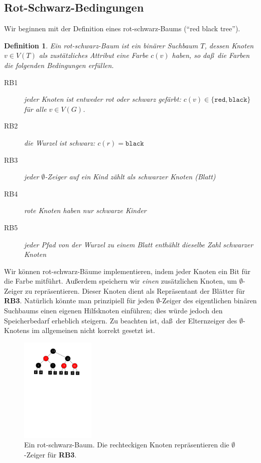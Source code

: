\documentclass[10pt,reqno]{amsart}
\numberwithin{equation}{section}
\newcommand\red{\mathtt{red}}
\newcommand\black{\mathtt{black}}
\newtheorem{definition}{Definition}[section]
\begin{document}
\subsection{Rot-Schwarz-Bedingungen}\label{sec_rb_cond}

Wir beginnen mit der Definition eines rot-schwarz-Baums (``red black tree'').

\begin{definition}\label{def_rb}
	Ein rot-schwarz-Baum ist ein bin\"arer Suchbaum $T$, dessen Knoten $v\in V(T)$ als zust\"atzliches Attribut eine Farbe $c(v)$ haben, so da\ss\ die Farben die folgenden Bedingungen erf\"ullen.
	\begin{description}
		\item[RB1] jeder Knoten ist entweder rot oder schwarz gef\"arbt: $c(v)\in\{\red,\black\}$ f\"ur alle $v\in V(G)$.
		\item[RB2] die Wurzel ist schwarz: $c(r)=\black$
		\item[RB3] jeder $\emptyset$-Zeiger auf ein Kind z\"ahlt als schwarzer Knoten (Blatt)
		\item[RB4] rote Knoten haben nur schwarze Kinder
		\item[RB5] jeder Pfad von der Wurzel zu einem Blatt enth\"ahlt dieselbe Zahl schwarzer Knoten
	\end{description}
\end{definition}

Wir k\"onnen rot-schwarz-B\"aume implementieren, indem jeder Knoten ein Bit f\"ur die Farbe mitf\"uhrt.
Au\ss erdem speichern wir {\em einen} zus\"atzlichen Knoten, um $\emptyset$-Zeiger zu repr\"asentieren.
Dieser Knoten dient als Repr\"asentant der Bl\"atter f\"ur {\bf RB3}.
Nat\"urlich k\"onnte man prinzipiell f\"ur jeden $\emptyset$-Zeiger des eigentlichen bin\"aren Suchbaums einen eigenen Hilfsknoten einf\"uhren; dies w\"urde jedoch den Speicherbedarf erheblich steigern.
Zu beachten ist, da\ss\ der Elternzeiger des $\emptyset$-Knotens im allgemeinen nicht korrekt gesetzt ist.

\begin{figure}
	\includegraphics[height=50mm]{./images/redblack1.pdf}
	\caption{Ein rot-schwarz-Baum. Die rechteckigen Knoten repr\"asentieren die $\emptyset$-Zeiger f\"ur {\bf RB3}.}
\end{figure}
\end{document}
